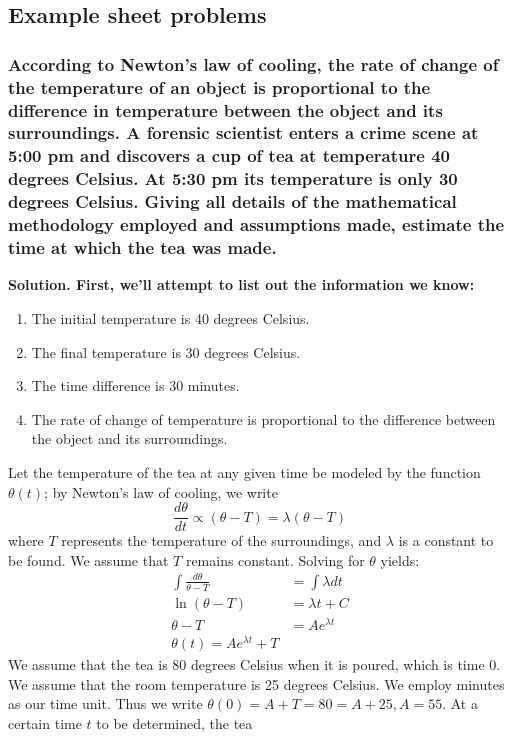 \documentclass{article}
\begin{document}
\subsection{Example sheet problems}
\subsubsection*{According to Newton’s law of cooling, the rate of change of the temperature of an object is
proportional to the difference in temperature between the object and its surroundings. A
forensic scientist enters a crime scene at 5:00 pm and discovers a cup of tea at temperature
40 degrees Celsius. At 5:30 pm its temperature is only 30 degrees Celsius. Giving all details of the mathematical
methodology employed and assumptions made, estimate the time at which the tea was made.}
\bf Solution. \normalfont First, we'll attempt to list out the information we know:
\begin{enumerate}
    \item The initial temperature is 40 degrees Celsius.
    \item The final temperature is 30 degrees Celsius.
    \item The time difference is 30 minutes.
    \item The rate of change of temperature is proportional to the difference between the object and its surroundings.
\end{enumerate}
Let the temperature of the tea at any given time be modeled by the function $\theta(t)$; by Newton's law of cooling, we write
\begin{equation*}
    \frac{d\theta}{dt} \propto (\theta - T) = \lambda(\theta - T)
\end{equation*}
where $T$ represents the temperature of the surroundings, and $\lambda$ is a constant to be found. We assume that $T$ remains constant. Solving for $\theta$ yields:
\begin{equation*}
    \begin{aligned}
    \int \frac{d\theta}{\theta - T} &= \int \lambda dt \\
    \ln (\theta - T) &= \lambda t + C \\
    \theta - T &= Ae^{\lambda t} \\
    \theta(t) = Ae^{\lambda t} + T
    \end{aligned}
\end{equation*}
We assume that the tea is $80$ degrees Celsius when it is poured, which is time $0$. We assume that the room temperature is 25 degrees Celsius. We employ minutes as our time unit. Thus we write $\theta(0) = A + T = 80 = A + 25, A = 55$. At a certain time $t$ to be determined, the tea 
\end{document}
